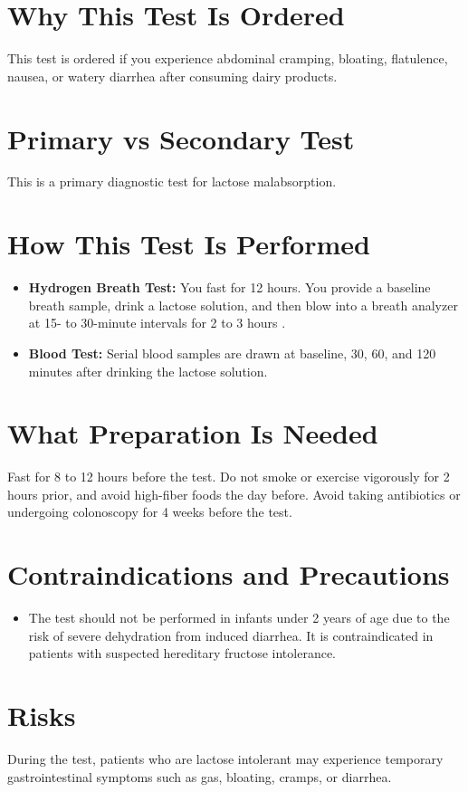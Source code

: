 \section*{Why This Test Is Ordered}
This test is ordered if you experience abdominal cramping, bloating, flatulence, nausea, or watery diarrhea after consuming dairy products.

\section*{Primary vs Secondary Test}
This is a primary diagnostic test for lactose malabsorption.

\section*{How This Test Is Performed}
\begin{itemize}
  \item \textbf{Hydrogen Breath Test:} You fast for 12 hours. You provide a baseline breath sample, drink a lactose solution, and then blow into a breath analyzer at 15- to 30-minute intervals for 2 to 3 hours \cite{hammer2022european}.
  \item \textbf{Blood Test:} Serial blood samples are drawn at baseline, 30, 60, and 120 minutes after drinking the lactose solution.
\end{itemize}

\section*{What Preparation Is Needed}
Fast for 8 to 12 hours before the test. Do not smoke or exercise vigorously for 2 hours prior, and avoid high-fiber foods the day before. Avoid taking antibiotics or undergoing colonoscopy for 4 weeks before the test.

\section*{Contraindications and Precautions}
\begin{itemize}
  \item The test should not be performed in infants under 2 years of age due to the risk of severe dehydration from induced diarrhea. It is contraindicated in patients with suspected hereditary fructose intolerance.
\end{itemize}
\section*{Risks}
During the test, patients who are lactose intolerant may experience temporary gastrointestinal symptoms such as gas, bloating, cramps, or diarrhea.

